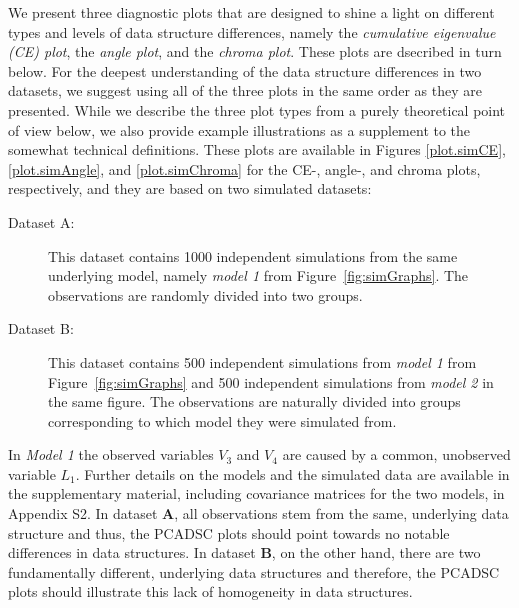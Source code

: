 \documentclass[a4paper,12pt]{article}
\begin{document}
We present three diagnostic plots that are designed to shine a light on different types and levels of data structure differences, namely the \textit{cumulative eigenvalue (CE) plot}, the \textit{angle plot}, and the \textit{chroma plot}. These plots are dsecribed in turn below. For the deepest understanding of the data structure differences in two datasets, we suggest using all of the three plots in the same order as they are presented. While we describe the three plot types from a purely theoretical point of view below, we also provide example illustrations as a supplement to the somewhat technical definitions. These plots are available in Figures \ref{plot.simCE}, \ref{plot.simAngle}, and \ref{plot.simChroma} for the CE-, angle-, and chroma plots, respectively, and they are based on two simulated datasets:
\begin{description}
\item[Dataset A:] This dataset contains 1000 independent simulations from the same underlying model, namely \textit{model 1} from Figure~\ref{fig:simGraphs}. The observations are randomly divided into two groups.
\item[Dataset B:] This dataset contains 500 independent simulations from \textit{model 1} from Figure~\ref{fig:simGraphs} and 500 independent simulations from \textit{model 2} in the same figure. The observations are naturally divided into groups corresponding to which model they were simulated from.
\end{description}

In \textit{Model 1} the observed variables $V_3$ and $V_4$ are caused by a common, unobserved variable $L_1$. Further details on the models and the simulated data are available in the supplementary material, including covariance matrices for the two models, in Appendix S2. In dataset $\mathbf{A}$, all observations stem from the same, underlying data structure and thus, the PCADSC plots should point towards no notable differences in data structures. In dataset $\mathbf{B}$, on the other hand, there are two fundamentally different, underlying data structures and therefore, the PCADSC plots should illustrate this lack of homogeneity in data structures.


\end{document}
